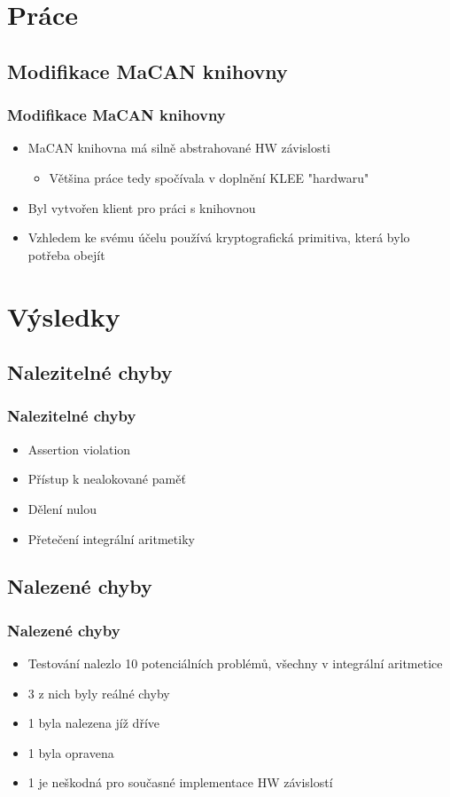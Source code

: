 \documentclass{beamer}
\begin{document}
\section{Práce}
\subsection*{Modifikace MaCAN knihovny}
\begin{frame}
\frametitle{Modifikace MaCAN knihovny}
\begin{itemize}
    \item MaCAN knihovna má silně abstrahované HW závislosti
    \begin{itemize}
    \item Většina práce tedy spočívala v doplnění KLEE "hardwaru"
    \end{itemize}
    \item Byl vytvořen klient pro práci s knihovnou
    \item Vzhledem ke svému účelu používá kryptografická primitiva, která bylo
    potřeba obejít
\end{itemize}
\end{frame}


\section{Výsledky}
\subsection*{Nalezitelné chyby}
\begin{frame}
\frametitle{Nalezitelné chyby}
\begin{itemize}
    \item Assertion violation
    \item Přístup k nealokované paměť
    \item Dělení nulou
    \item Přetečení integrální aritmetiky
\end{itemize}
\end{frame}

\subsection*{Nalezené chyby}
\begin{frame}
\frametitle{Nalezené chyby}
\begin{itemize}
    \item Testování nalezlo 10 potenciálních problémů, všechny v integrální aritmetice
    \item 3 z nich byly reálné chyby
    \item 1 byla nalezena jíž dříve
    \item 1 byla opravena
    \item 1 je neškodná pro současné implementace HW závislostí
\end{itemize}
\end{frame}
\end{document}
